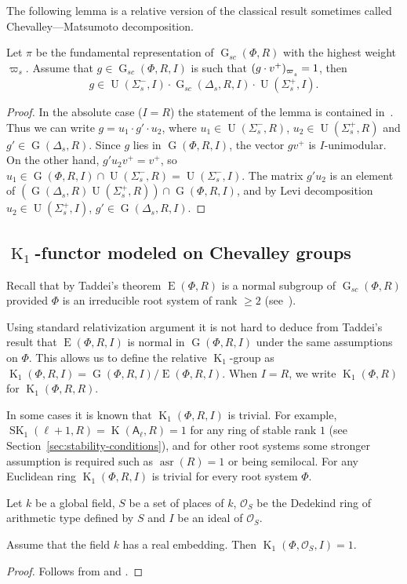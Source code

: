 \documentclass[12pt]{amsart}
\numberwithin{equation}{section}
\theoremstyle{definition}
\DeclareMathOperator{\K}{K}
\DeclareMathOperator{\SK}{SK}
\DeclareMathOperator{\G}{G}
\DeclareMathOperator{\E}{E}
\DeclareMathOperator{\U}{U}
\DeclareMathOperator{\asr}{asr}
\newcommand{\rA}{\mathsf{A}}
\def\ssub#1{\mathchoice
   {_{\lower2pt\hbox{$\scriptstyle #1$}}}
   {_{\lower2pt\hbox{$\scriptstyle #1$}}}
   {_{\lower1.5pt\hbox{$\scriptscriptstyle #1$}}}
   {_{\!\lower1.5pt\hbox{$\scriptscriptstyle #1$}}}}
\begin{document}
The following lemma is a relative version of the classical result sometimes called Chevalley---Matsumoto decomposition.
\begin{lemma}\label{lemma:Chevalley-Matsumoto}
Let $\pi$ be the fundamental representation of $\G_{sc}(\Phi, R)$ with the highest weight $\varpi_s$.
Assume that $g\in \G_{sc}(\Phi, R, I)$ is such that $(g\cdot v^+)_{\varpi\ssub{s}}=1$, then 
\[ g \in \U(\Sigma_s^-, I) \cdot \G_{sc}(\Delta_s, R, I) \cdot \U(\Sigma_s^+, I). \]
\end{lemma}
\begin{proof}
In the absolute case ($I=R$) the statement of the lemma is contained in~\cite[Theorem~1.3]{St78}. 
Thus we can write $g=u_1\cdot g'\cdot u_2$, where $u_1\in\U(\Sigma_s^-,R)$, $u_2\in\U(\Sigma_s^+,R)$ and $g'\in\G(\Delta_s,R)$.
Since $g$ lies in $\G(\Phi,R,I)$, the vector $gv^+$ is $I$-unimodular. 
On the other hand, $g'u_2v^+=v^+$, so $u_1\in\G(\Phi,R,I)\cap\U(\Sigma_s^-,R)=\U(\Sigma_s^-,I)$.
The matrix $g'u_2$ is an element of $\left(\G(\Delta_s,R)\U(\Sigma_s^+,R)\right)\cap\G(\Phi,R,I)$, and by Levi decomposition $u_2\in\U(\Sigma_s^+,I)$, $g'\in\G(\Delta_s,R,I)$.
\end{proof}

\subsection{$\K_1$-functor modeled on Chevalley groups}
Recall that by Taddei's theorem $\E(\Phi, R)$ is a normal subgroup of $\G_{sc}(\Phi, R)$ provided $\Phi$ is an irreducible root system of rank $\geqslant 2$ (see~\cite{Ta}).

Using standard relativization argument it is not hard to deduce from Taddei's result that $\E(\Phi,R,I)$ is normal in $\G(\Phi,R,I)$ under the same assumptions on $\Phi$.
This allows us to define the relative $\K_1$-group as $\K_1(\Phi,R,I)=\G(\Phi,R,I)/\E(\Phi,R,I).$
When $I=R$, we write $\K_1(\Phi, R)$ for $\K_1(\Phi, R, R)$.

In some cases it is known that $\K_1(\Phi, R, I)$ is trivial.
For example, $\SK_1(\ell+1,R)=\K(\rA_\ell,R)=1$ for any ring of stable rank $1$ (see Section~\ref{sec:stability-conditions}), 
and for other root systems some stronger assumption is required such as $\asr(R)=1$ or being semilocal. 
For any Euclidean ring $\K_1(\Phi, R, I)$ is trivial for every root system $\Phi$.

Let $k$ be a global field, $S$ be a set of places of $k$, 
$\mathcal{O}_S$ be the Dedekind ring of arithmetic type defined by $S$ and $I$ be an ideal of $\mathcal{O}_S$.
\begin{prop} \label{prop:K1triv} Assume that the field $k$ has a real embedding. Then $\K_1(\Phi,\mathcal{O}_S,I)=1$. \end{prop}
\begin{proof} Follows from \cite[Theorem~3.6]{BassMilnorSerre} and \cite[Corollary~4.5]{Ma69}. \end{proof}
\end{document}
